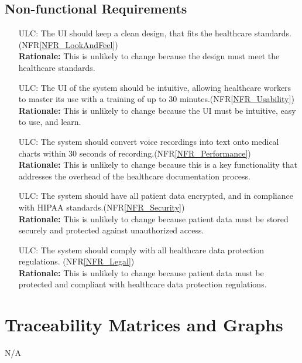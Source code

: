 \documentclass[12pt]{article}
\newcounter{lcnum} %
\newcounter{ulcnum} %
\begin{document}
\subsection{Non-functional Requirements}
\noindent \begin{itemize}
  \item[ULC\refstepcounter{ulcnum}\theulcnum\label{ULC_LookAndFeel}:] The UI should keep a clean design, that fits the healthcare standards.(NFR\ref{NFR_LookAndFeel})\\
  \textbf{Rationale:} This is unlikely to change because the design must meet the healthcare standards.

  \item[ULC\refstepcounter{ulcnum}\theulcnum\label{ULC_usability}:] The UI of the system should be intuitive, allowing healthcare workers to master its use with a training of up to 30 minutes.(NFR\ref{NFR_Usability})\\
  \textbf{Rationale:} This is unlikely to change because the UI must be intuitive, easy to use, and learn.

  \item[ULC\refstepcounter{ulcnum}\theulcnum\label{ULC_performance}:] The system should convert voice recordings into text onto medical charts within 30 seconds of recording.(NFR\ref{NFR_Performance})\\
  \textbf{Rationale:} This is unlikely to change because this is a key functionality that addresses the overhead of the healthcare documentation process.

  \item[ULC\refstepcounter{ulcnum}\theulcnum\label{ULC_security}:] The system should have all patient data encrypted, and in compliance with HIPAA standards.(NFR\ref{NFR_Security})\\
  \textbf{Rationale:} This is unlikely to change because patient data must be stored securely and protected against unauthorized access.

  \item[ULC\refstepcounter{ulcnum}\theulcnum\label{ULC_legal}:] The system should comply with all healthcare data protection regulations. (NFR\ref{NFR_Legal})\\
  \textbf{Rationale:} This is unlikely to change because patient data must be protected and compliant with healthcare data protection regulations.
\end{itemize}



\section{Traceability Matrices and Graphs}
N/A   
\end{document}
